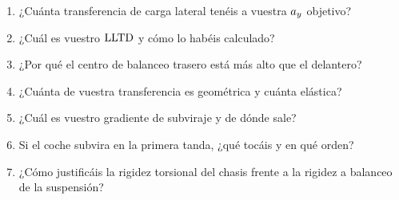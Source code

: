 \begin{juez}
\begin{enumerate}
  \item ¿Cuánta transferencia de carga lateral tenéis a vuestra $a_y$ objetivo?
  \item ¿Cuál es vuestro $\mathrm{LLTD}$ y cómo lo habéis calculado?
  \item ¿Por qué el centro de balanceo trasero está más alto que el delantero?
  \item ¿Cuánta de vuestra transferencia es geométrica y cuánta elástica?
  \item ¿Cuál es vuestro gradiente de subviraje y de dónde sale?
  \item Si el coche subvira en la primera tanda, ¿qué tocáis y en qué orden?
  \item ¿Cómo justificáis la rigidez torsional del chasis frente a la rigidez a
        balanceo de la suspensión?
\end{enumerate}
\end{juez}
